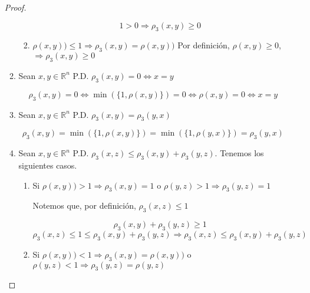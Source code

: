 \documentclass[12pt]{article}
\newcommand{\subscript}[2]{$#1 _ #2$}
\newcommand\R{\ensuremath{\mathbb{R}}}
\begin{document}
\begin{enumerate}[label=\textbf{\arabic*}.]
\begin{proof}
\begin{enumerate}[label=(\subscript{D}{{\arabic*}})]
\begin{enumerate}[label=\alph*)]
\begin{equation*}
    1 > 0 \Rightarrow {\rho}_{3}(x,y) \geqslant 0
\end{equation*}

\item $\rho(x,y)) \leqslant 1 \Rightarrow {\rho}_{3}(x,y)=\rho(x,y)) $ Por definición,  $\rho(x,y) \geqslant 0$, $\Rightarrow {\rho}_{3}(x,y)\geqslant 0$

\end{enumerate}

\item Sean $x,y \in \mathbb{R}^{n}$ P.D. ${\rho}_{3}(x,y) = 0 \Leftrightarrow x=y$

 \begin{equation*}
     {\rho}_{3}(x,y) = 0 \Leftrightarrow \min(\{1,\rho(x,y)\}) = 0 \Leftrightarrow \rho(x,y) = 0 \Leftrightarrow x=y
 \end{equation*}

\item   Sean $x,y \in \R^{n}$ P.D. ${\rho}_{3}(x,y) ={\rho}_{3}(y,x) $

\begin{equation*}
     {\rho}_{3}(x,y) = \min(\{1,\rho(x,y)\}) = \min(\{1,\rho(y,x)\}) = {\rho}_{3}(y,x)
\end{equation*}

\item  Sean $x,y \in \mathbb{R}^{n}$ P.D. ${\rho}_{3}(x,z) \leqslant {\rho}_{3}(x,y) +{\rho}_{3}(y,z)$. Tenemos los siguientes casos.

\begin{enumerate}[label=\alph*)]
    \item  Si $\rho(x,y)) > 1 \Rightarrow {\rho}_{3}(x,y)=1 $ o ${\rho}(y,z) > 1 \Rightarrow {\rho}_{3}(y,z)=1 $

Notemos que, por definición, ${\rho}_{3}(x,z) \leqslant 1$

\begin{equation*}
    {\rho}_{3}(x,y) +{\rho}_{3}(y,z) \geqslant 1
\end{equation*}
\begin{equation*}
    {\rho}_{3}(x,z) \leqslant 1 \leqslant {\rho}_{3}(x,y) +{\rho}_{3}(y,z) \Rightarrow {\rho}_{3}(x,z) \leqslant {\rho}_{3}(x,y) +{\rho}_{3}(y,z)
\end{equation*}

\smallskip

\item Si $\rho(x,y)) < 1 \Rightarrow {\rho}_{3}(x,y)=\rho(x,y)) $ o ${\rho}(y,z) < 1 \Rightarrow {\rho}_{3}(y,z)={\rho}(y,z) $


\end{enumerate}
\end{enumerate}
\end{proof}
\end{enumerate}
\end{document}
